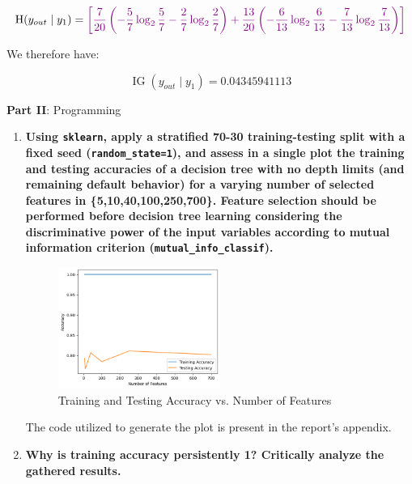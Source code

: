 \documentclass[12pt]{article}
\begin{document}
\begin{enumerate}[leftmargin=\labelsep]
        \begin{equation}
          \operatorname{H}(y_{out} \mid y_1) = \textcolor{violet}{\left[\frac{7}{20}\left(- {\frac{5}{7}} \log_2 \frac{5}{7} - \frac{2}{7} \log_2 \frac{2}{7}\right) + \frac{13}{20}\left(- \frac{6}{13} \log_2 \frac{6}{13} - \frac{7}{13} \log_2 \frac{7}{13}\right)\right]}
        \end{equation}

        We therefore have:

        $$
          \operatorname{IG}(y_{out} \mid y_1) = 0.04345941113
        $$

\end{enumerate}

\center\large{\textbf{Part II}: Programming}

\begin{enumerate}[leftmargin=\labelsep,resume]
  \item \textbf{Using \texttt{sklearn}, apply a stratified 70-30 training-testing split with a fixed seed (\texttt{random\_state=1}), and assess in a single plot the training and testing accuracies of a decision tree with no depth limits (and remaining default behavior) for a varying number of selected features in \{5,10,40,100,250,700\}. Feature selection should be performed before decision tree learning considering the discriminative power of the input variables according to mutual information criterion (\texttt{mutual\_info\_classif}).}

        \begin{figure}[htpb]
          \centering
          \includegraphics[width=0.5\textwidth]{../assets/hw1-2.1.png}
          \caption{Training and Testing Accuracy vs. Number of Features}
        \end{figure}

        The code utilized to generate the plot is present in the report's appendix.

  \item \textbf{Why is training accuracy persistently 1? Critically analyze the gathered results.}


\end{enumerate}
\end{document}

